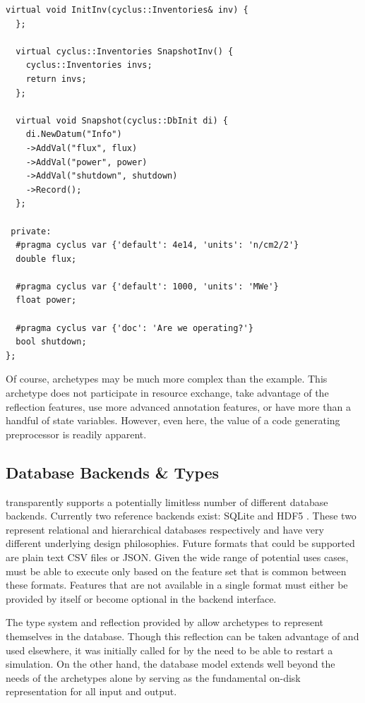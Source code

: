 \begin{lstlisting}[caption={Simple Reactor Archetype After Preprocessing with \cycpp, 
                            line marker directives have been removed for space}, 
                   label=rx-eg-cycpp]
  virtual void InitInv(cyclus::Inventories& inv) {
  };

  virtual cyclus::Inventories SnapshotInv() {
    cyclus::Inventories invs;
    return invs;
  };

  virtual void Snapshot(cyclus::DbInit di) {
    di.NewDatum("Info")
    ->AddVal("flux", flux)
    ->AddVal("power", power)
    ->AddVal("shutdown", shutdown)
    ->Record();
  };

 private:
  #pragma cyclus var {'default': 4e14, 'units': 'n/cm2/2'}
  double flux;

  #pragma cyclus var {'default': 1000, 'units': 'MWe'}
  float power;

  #pragma cyclus var {'doc': 'Are we operating?'}
  bool shutdown;
};
\end{lstlisting}

Of course, archetypes may be much more complex than the  example.
This archetype does not participate in resource exchange, take advantage of 
the reflection features, use more advanced annotation features, or have more than 
a handful of state variables.  However, even here, the value of a code generating
preprocessor is readily apparent.

\subsection{Database Backends \& Types}

\Cyclus transparently supports a potentially limitless number of different database 
backends. Currently two reference backends exist: \gls{SQLite} \cite{owens2006definitive} 
and \gls{HDF5} \cite{folk2011overview}. These two represent relational and hierarchical 
databases respectively and have very different underlying design philosophies.
Future formats that could be supported are plain text 
\gls{CSV} files or \gls{JSON}.  Given the wide range of potential uses cases, \cyclus must be able 
to execute only based on the feature set that is common between these formats.
Features that are not available in a single format must either be provided by \cyclus 
itself or become optional in the backend interface.

The type system and reflection provided by \cycpp 
allow archetypes to represent themselves in the database. Though this 
reflection can be taken advantage of and used elsewhere, it was initially called for 
by the need to be able to restart a simulation. On the other hand, 
the database model extends well beyond the needs of the archetypes alone by 
serving as the fundamental on-disk representation for all \cyclus input and output.

